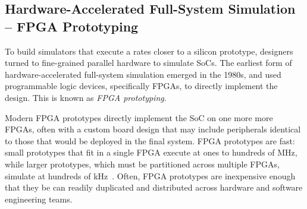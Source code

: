 \subsection{Hardware-Accelerated Full-System Simulation -- FPGA Prototyping}

To build simulators that execute a rates closer to a silicon prototype, designers turned
to fine-grained parallel hardware to simulate SoCs.  The earliest form of
hardware-accelerated full-system simulation emerged in the 1980s, and used
programmable logic devices, specifically FPGAs, to directly implement the
design. This is known as \textit{FPGA prototyping}.

Modern FPGA prototypes directly implement the SoC on one more
more FPGAs, often with a custom board design that may include peripherals
identical to those that would be deployed in the final system.  FPGA prototypes
are fast: small prototypes that fit in a single FPGA execute at ones to hundreds of
MHz, while larger prototypes, which must be partitioned across multiple FPGAs,
simulate at hundreds of kHz~\cite{nehalemprototype, atomprototype}.
Often, FPGA prototypes are inexpensive enough that they be can readily
duplicated and distributed across hardware and software engineering teams.

